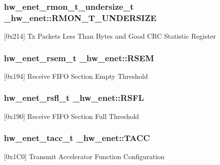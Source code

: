 \subsubsection[{\texorpdfstring{R\+M\+O\+N\+\_\+\+T\+\_\+\+U\+N\+D\+E\+R\+S\+I\+ZE}{RMON_T_UNDERSIZE}}]{ {\bf hw\+\_\+enet\+\_\+rmon\+\_\+t\+\_\+undersize\+\_\+t} \+\_\+hw\+\_\+enet\+::\+R\+M\+O\+N\+\_\+\+T\+\_\+\+U\+N\+D\+E\+R\+S\+I\+ZE}\hypertarget{struct__hw__enet_a2a8c87ee9ff26e578d2655dae28cfdff}{}\label{struct__hw__enet_a2a8c87ee9ff26e578d2655dae28cfdff}
\mbox{[}0x214\mbox{]} Tx Packets Less Than Bytes and Good C\+RC Statistic Register 
\subsubsection[{\texorpdfstring{R\+S\+EM}{RSEM}}]{ {\bf hw\+\_\+enet\+\_\+rsem\+\_\+t} \+\_\+hw\+\_\+enet\+::\+R\+S\+EM}\hypertarget{struct__hw__enet_af4770a940264777bad4448132c54b377}{}\label{struct__hw__enet_af4770a940264777bad4448132c54b377}
\mbox{[}0x194\mbox{]} Receive F\+I\+FO Section Empty Threshold 
\subsubsection[{\texorpdfstring{R\+S\+FL}{RSFL}}]{ {\bf hw\+\_\+enet\+\_\+rsfl\+\_\+t} \+\_\+hw\+\_\+enet\+::\+R\+S\+FL}\hypertarget{struct__hw__enet_a18440fb0018cb8b5ed1bfaaad3eb6465}{}\label{struct__hw__enet_a18440fb0018cb8b5ed1bfaaad3eb6465}
\mbox{[}0x190\mbox{]} Receive F\+I\+FO Section Full Threshold 
\subsubsection[{\texorpdfstring{T\+A\+CC}{TACC}}]{ {\bf hw\+\_\+enet\+\_\+tacc\+\_\+t} \+\_\+hw\+\_\+enet\+::\+T\+A\+CC}\hypertarget{struct__hw__enet_a63564b5fd15feb599f1ddbfa0db42bc5}{}\label{struct__hw__enet_a63564b5fd15feb599f1ddbfa0db42bc5}
\mbox{[}0x1\+C0\mbox{]} Transmit Accelerator Function Configuration 
